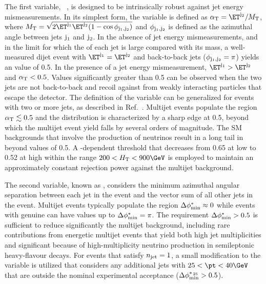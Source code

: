 The first variable, \alphat~\cite{Randall:2008rw, Khachatryan:2011tk},
is designed to be intrinsically robust against jet energy
mismeasurements. In its simplest form, the \alphat variable is defined
as $\alphat = \ET^{\jet{2}}/M_\mathrm{T}$, where $M_\mathrm{T} = \sqrt{\smash[b]{ 2
  \ET^{\jet{1}} \ET^{\jet{2}} (1 - \cos\phi_{\jet{1},\jet{2}})}}$ and
$\phi_{\mathrm{j}_\text{1},\mathrm{j}_\text{2}}$ is defined as the azimuthal angle between
jets $\mathrm{j}_\text{1}$ and $\mathrm{j}_\text{2}$. In the absence of jet energy
mismeasurements, and in the limit for which the \ET of each jet is
large compared with its mass, a well-measured dijet event with
$\ET^{\jet{1}} = \ET^{\jet{2}}$ and back-to-back jets
($\phi_{\mathrm{j}_\text{1},\mathrm{j}_\text{2}} = \pi$) yields an \alphat value of 0.5. In
the presence of a jet energy mismeasurement, $\ET^{\jet{1}} >
\ET^{\jet{2}}$ and $\alpha_{\mathrm{T}} < 0.5$. Values significantly greater than
0.5 can be observed when the two jets are not back-to-back and recoil
against \ptvecmiss from weakly interacting particles that escape the
detector. The definition of the \alphat variable can be generalized
for events with two or more jets, as described in
Ref.~\cite{Khachatryan:2011tk}. Multijet events populate the region
$\alpha_{\mathrm{T}} \lesssim 0.5$ and the \alphat distribution is characterized
by a sharp edge at 0.5, beyond which the multijet event yield falls by
several orders of magnitude. The SM backgrounds that involve the
production of neutrinos result in a long tail in \alphat beyond values
of 0.5. A \scalht-dependent \alphat threshold that decreases from 0.65
at low \scalht to 0.52 at high \scalht within the range $200 < \scalht
< 900\GeV$ is employed to maintain an approximately constant rejection
power against the multijet background.

The second variable, known as \bdphi, considers the minimum azimuthal
angular separation between each jet in the event and the vector \pt
sum of all other jets in the event. Multijet events typically populate
the region $\Delta\phi^{*}_\text{min} \approx 0$ while events with genuine \ptvecmiss can
have values up to $\Delta\phi^{*}_\text{min} = \pi$. The requirement $\Delta\phi^{*}_\text{min} > 0.5$ is
sufficient to reduce significantly the multijet background, including
rare contributions from energetic multijet events that yield both high
jet multiplicities and significant \ptvecmiss because of
high-multiplicity neutrino production in semileptonic heavy-flavour
decays. For events that satisfy $n_{\text{jet}} = 1$, a small modification to
the \bdphi variable is utilized that considers any additional jets
with $25 < \pt < 40\GeV$ that are outside the nominal experimental
acceptance ($\Delta\phi^{*_{\, 25}}_\text{min} > 0.5$).

